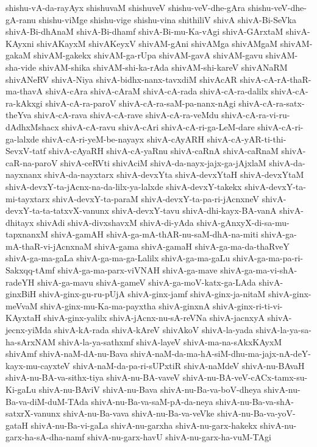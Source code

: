 {shishu-vA-da-rayAyx
shishuvaM
shishuveV
shishu-veV-dhe-gAra
shishu-veV-dhe-gA-ranu
shishu-viMge
shishu-vige
shishu-vina
shithiliV
shivA
shivA-Bi-SeVka
shivA-Bi-dhAnaM
shivA-Bi-dhamf
shivA-Bi-mu-Ka-vAgi
shivA-GArxtaM
shivA-KAyxni
shivAKayxM
shivAKeyxV
shivAM-gAni
shivAMga
shivAMgaM
shivAM-gakaM
shivAM-gakekx
shivAM-ga-rUpa
shivAM-gavA
shivAM-gavu
shivAM-sha-vide
shivAM-shika
shivAM-shi-ka-rAda
shivAM-shi-kareV
shivANaRM
shivANeRV
shivA-Niya
shivA-bidhx-nanx-tavxdiM
shivAcAR
shivA-cA-rA-thaR-ma-thavA
shivA-cAra
shivA-cAraM
shivA-cA-rada
shivA-cA-ra-dalilx
shivA-cA-ra-kAkxgi
shivA-cA-ra-paroV
shivA-cA-ra-saM-pa-nanx-nAgi
shivA-cA-ra-satx-theYva
shivA-cA-rava
shivA-cA-rave
shivA-cA-ra-veMdu
shivA-cA-ra-vi-ru-dAdhxMshacx
shivA-cA-ravu
shivA-cAri
shivA-cA-ri-ga-LeM-dare
shivA-cA-ri-ga-lalxde
shivA-cA-ri-yeM-be-nayayx
shivA-cAyARH
shivA-cA-yAR-ti-thi-SevxV-tatf
shivA-cAyaRH
shivA-cA-yaRnu
shivA-caRnA
shivA-caRnaM
shivA-caR-na-paroV
shivA-ceRVti
shivAciM
shivA-da-nayx-jajx-ga-jAjxlaM
shivA-da-nayxnanx
shivA-da-nayxtarx
shivA-devxYta
shivA-devxYtaH
shivA-devxYtaM
shivA-devxY-ta-jAcnx-na-da-lilx-ya-lalxde
shivA-devxY-takekx
shivA-devxY-ta-mi-tayxtarx
shivA-devxY-ta-paraM
shivA-devxY-ta-pa-ri-jAcnxneV
shivA-devxY-ta-ta-tatxvX-vanunx
shivA-devxY-tavu
shivA-dhi-kayx-BA-vanA
shivA-dhitayx
shivAdi
shivA-divxshavxM
shivA-di-yAda
shivA-gAnxyX-di-sa-mu-tapxnanxM
shivA-gamAH
shivA-ga-mA-thAR-nu-saM-dhA-na-miti
shivA-ga-mA-thaR-vi-jAcnxnaM
shivA-gama
shivA-gamaH
shivA-ga-ma-da-thaRveY
shivA-ga-ma-gaLa
shivA-ga-ma-ga-Lalilx
shivA-ga-ma-gaLu
shivA-ga-ma-pa-ri-Sakxqq-tAmf
shivA-ga-ma-parx-viVNAH
shivA-ga-mave
shivA-ga-ma-vi-shA-radeYH
shivA-ga-mavu
shivA-gameV
shivA-ga-moV-katx-ga-LAda
shivA-ginxBiH
shivA-ginx-gu-ru-pUjA
shivA-ginx-jamf
shivA-ginx-ja-nitaM
shivA-ginx-meVvaM
shivA-ginx-mu-Ka-ma-payxtha
shivA-ginxnA
shivA-ginx-ri-ti-vi-KAyxtaH
shivA-ginx-yalilx
shivA-jAcnx-nu-sA-reVNa
shivA-jacnxyA
shivA-jecnx-yiMda
shivA-kA-rada
shivA-kAreV
shivAkoV
shivA-la-yada
shivA-la-ya-sa-ha-sArxNAM
shivA-la-ya-sathxmf
shivA-layeV
shivA-ma-na-sAkxKAyxM
shivAmf
shivA-naM-dA-nu-Bava
shivA-naM-da-ma-hA-siM-dhu-ma-jajx-nA-deY-kayx-mu-cayxteV
shivA-naM-da-pa-ri-sUPxtiR
shivA-naMdeV
shivA-nu-BAvaH
shivA-nu-BA-va-sithx-tiya
shivA-nu-BA-vaveV
shivA-nu-BA-veV-cACx-tamx-su-Ki-gaLu
shivA-nu-BAviV
shivA-nu-Bava
shivA-nu-Ba-va-boV-dheya
shivA-nu-Ba-va-diM-duM-TAda
shivA-nu-Ba-va-saM-pA-da-neya
shivA-nu-Ba-va-shA-satxrX-vanunx
shivA-nu-Ba-vava
shivA-nu-Ba-va-veVke
shivA-nu-Ba-va-yoV-gataH
shivA-nu-Ba-vi-gaLa
shivA-nu-garxha
shivA-nu-garx-hakekx
shivA-nu-garx-ha-sA-dha-namf
shivA-nu-garx-havU
shivA-nu-garx-ha-vuM-TAgi
}
